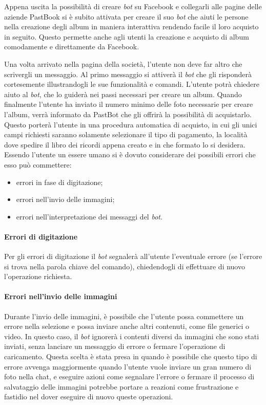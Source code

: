 Appena uscita la possibilità di creare \textit{bot} su Facebook e collegarli
alle pagine delle aziende PastBook si è subito attivata per creare il suo
\textit{bot} che aiuti le persone nella creazione degli album in maniera
interattiva rendendo facile il loro acquisto in seguito. Questo permette anche
agli utenti la creazione e acquisto di album comodamente e direttamente da
Facebook.

Una volta arrivato nella pagina della società, l'utente non deve far altro che
scrivergli un messaggio. Al primo messaggio si attiverà il \textit{bot} che
gli risponderà cortesemente illustrandogli le sue funzionalità e comandi.
L'utente potrà chiedere aiuto al \textit{bot}, che lo guiderà nei passi
necessari per creare un album. Quando finalmente l'utente ha inviato il numero
minimo delle foto necessarie per creare l'album, verrà informato da PastBot che
gli offrirà la possibilità di acquistarlo. Questo porterà l'utente in una
procedura automatica di acquisto, in cui gli unici campi richiesti saranno
solamente selezionare il tipo di pagamento, la località dove spedire il libro
dei ricordi appena creato e in che formato lo si desidera. \\

Essendo l'utente un essere umano si è dovuto considerare dei possibili errori
che esso può commettere:
\begin{itemize}
  \item errori in fase di digitazione;
  \item errori nell'invio delle immagini;
  \item errori nell'interpretazione dei messaggi del \textit{bot}.
\end{itemize}

\paragraph*{Errori di digitazione} Per gli errori di digitazione il \textit{bot}
segnalerà all'utente l'eventuale errore (se l'errore si trova nella parola
chiave del comando), chiedendogli di effettuare di nuovo l'operazione richiesta.

\paragraph*{Errori nell'invio delle immagini} Durante l'invio delle immagini, è
possibile che l'utente possa commettere un errore nella selezione e possa
inviare anche altri contenuti, come file generici o video. In questo caso, il
\textit{bot} ignorerà i contenti diversi da immagini che sono stati inviati,
senza lanciare un messaggio di errore o fermare l'operazione di caricamento.
Questa scelta è stata presa in quando è possibile che questo tipo di errore
avvenga maggiormente quando l'utente vuole inviare un gran numero di foto nella
chat, e eseguire azioni come segnalare l'errore o fermare il processo di
salvataggio delle immagini potrebbe portare a reazioni come frustrazione e
fastidio nel dover eseguire di nuovo queste operazioni.

